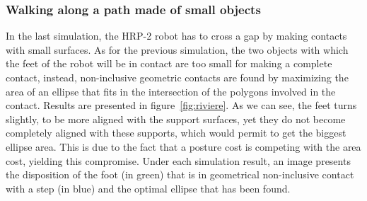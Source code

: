 


\subsubsection{Walking along a path made of small objects}
\label{subsubsec:riviere}


In the last simulation, the HRP-2 robot has to cross a gap by making contacts
with small surfaces.
As for the previous simulation, the two objects
with which the feet of the robot will be in contact are too small for making a
complete contact, instead, non-inclusive geometric contacts are found by
maximizing the area of an ellipse that fits in the intersection of the polygons
involved in the contact.
Results are presented in figure~\ref{fig:riviere}.
As we can see, the feet turns slightly, to be more aligned with the support
surfaces, yet they do not become completely aligned with these supports, which would permit to get the biggest ellipse area.
This is due to the fact that a posture cost is competing with the area cost, yielding this compromise.
Under each simulation result, an image presents the disposition of the foot (in green) that is in geometrical non-inclusive contact with a step (in blue) and the optimal ellipse that has been found.

